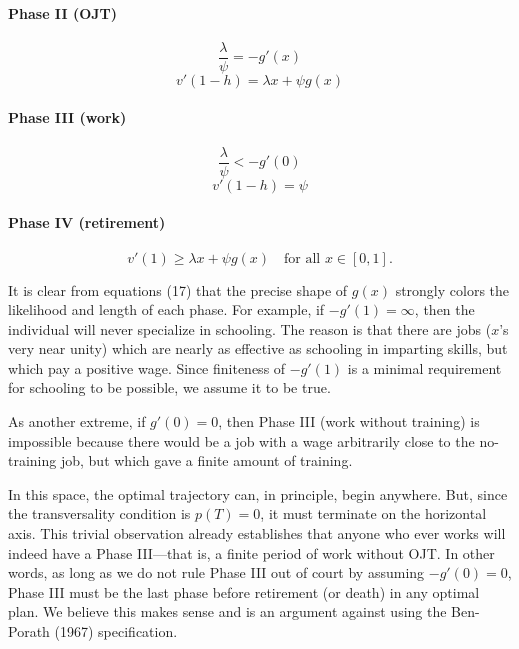 \documentclass[11pt,fleqn]{article}
\begin{document}
\paragraph{Phase II (OJT)}
\begin{equation}
\frac{\lambda}{\psi} = -g'(x)
\end{equation}
\begin{equation}
v'(1 - h) = \lambda x + \psi g(x)
\end{equation}

\paragraph{Phase III (work)}
\begin{equation}
\frac{\lambda}{\psi} < -g'(0)
\end{equation}
\begin{equation}
v'(1 - h) = \psi
\end{equation}

\paragraph{Phase IV (retirement)}
\begin{equation}
v'(1) \geq \lambda x + \psi g(x) \quad \text{for all } x \in [0, 1].
\end{equation}

It is clear from equations (17) that the precise shape of $g(x)$ strongly colors the likelihood and length of each phase. For example, if $-g'(1) = \infty$, then the individual will never specialize in schooling. The reason is that there are jobs ($x$'s very near unity) which are nearly as effective as schooling in imparting skills, but which pay a positive wage. Since finiteness of $-g'(1)$ is a minimal requirement for schooling to be possible, we assume it to be true.

As another extreme, if $g'(0) = 0$, then Phase III (work without training) is impossible because there would be a job with a wage arbitrarily close to the no-training job, but which gave a finite amount of training.

In this space, the optimal trajectory can, in principle, begin anywhere. But, since the transversality condition is $p(T) = 0$, it must terminate on the horizontal axis. This trivial observation already establishes that anyone who ever works will indeed have a Phase III---that is, a finite period of work without OJT. In other words, as long as we do not rule Phase III out of court by assuming $-g'(0) = 0$, Phase III must be the last phase before retirement (or death) in any optimal plan. We believe this makes sense and is an argument against using the Ben-Porath (1967) specification.
\end{document}
